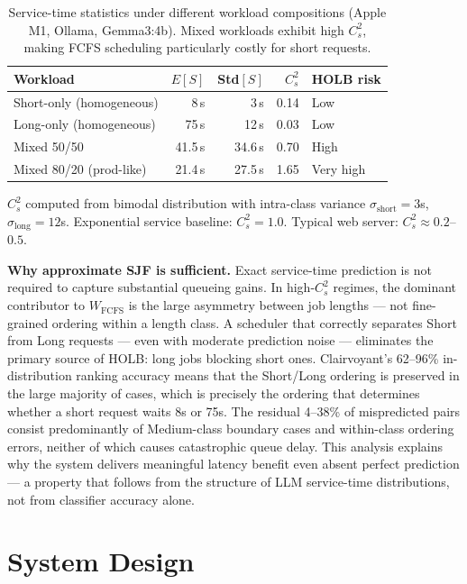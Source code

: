 \documentclass[10pt,letterpaper]{article}
\begin{document}
\begin{table}[h]
\centering
\caption{Service-time statistics under different workload compositions (Apple M1, Ollama, Gemma3:4b). Mixed workloads exhibit high $C_s^2$, making FCFS scheduling particularly costly for short requests.}
\label{tab:variance}
\small
\begin{tabular}{lrrrl}
\toprule
Workload & $E[S]$ & Std$[S]$ & $C_s^2$ & HOLB risk \\
\midrule
Short-only (homogeneous) & 8\,s  & 3\,s  & 0.14 & Low \\
Long-only (homogeneous)  & 75\,s & 12\,s & 0.03 & Low \\
Mixed 50/50              & 41.5\,s & 34.6\,s & 0.70 & High \\
Mixed 80/20 (prod-like)  & 21.4\,s & 27.5\,s & 1.65 & Very high \\
\bottomrule
\end{tabular}
\smallskip\noindent\footnotesize{$C_s^2$ computed from bimodal distribution with intra-class variance $\sigma_\text{short}=3$s, $\sigma_\text{long}=12$s. Exponential service baseline: $C_s^2=1.0$. Typical web server: $C_s^2 \approx 0.2$--$0.5$.}
\end{table}

\textbf{Why approximate SJF is sufficient.} Exact service-time prediction is not required to capture substantial queueing gains. In high-$C_s^2$ regimes, the dominant contributor to $W_{\text{FCFS}}$ is the large asymmetry between job lengths --- not fine-grained ordering within a length class. A scheduler that correctly separates Short from Long requests --- even with moderate prediction noise --- eliminates the primary source of HOLB: long jobs blocking short ones. Clairvoyant's 62--96\% in-distribution ranking accuracy means that the Short/Long ordering is preserved in the large majority of cases, which is precisely the ordering that determines whether a short request waits 8s or 75s. The residual 4--38\% of mispredicted pairs consist predominantly of Medium-class boundary cases and within-class ordering errors, neither of which causes catastrophic queue delay. This analysis explains why the system delivers meaningful latency benefit even absent perfect prediction --- a property that follows from the structure of LLM service-time distributions, not from classifier accuracy alone.

\section{System Design}
\label{sec:system}
\end{document}
